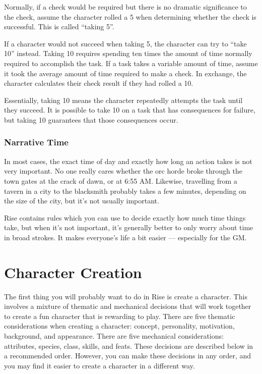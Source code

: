             \label{Taking 5}
            Normally, if a check would be required but there is no dramatic significance to the check, assume the character rolled a 5 when determining whether the check is successful.
            This is called ``taking 5''.

            \label{Taking 10}
            If a character would not succeed when taking 5, the character can try to ``take 10'' instead.
            Taking 10 requires spending ten times the amount of time normally required to accomplish the task.
            If a task takes a variable amount of time, assume it took the average amount of time required to make a check.
            In exchange, the character calculates their check result if they had rolled a 10.

            Essentially, taking 10 means the character repeatedly attempts the task until they succeed.
            It is possible to take 10 on a task that has consequences for failure, but taking 10 guarantees that those consequences occur.

        \subsubsection{Narrative Time}
            In most cases, the exact time of day and exactly how long an action takes is not very important.
            No one really cares whether the orc horde broke through the town gates at the crack of dawn, or at 6:55 AM\@.
            Likewise, travelling from a tavern in a city to the blacksmith probably takes a few minutes, depending on the size of the city, but it's not usually important.

            Rise contains rules which you can use to decide exactly how much time things take, but when it's not important, it's generally better to only worry about time in broad strokes.
            It makes everyone's life a bit easier --- especially for the GM\@.

\section{Character Creation}

    The first thing you will probably want to do in Rise is create a character.
    This involves a mixture of thematic and mechanical decisions that will work together to create a fun character that is rewarding to play.
    There are five thematic considerations when creating a character: concept, personality, motivation, background, and appearance.
    There are five mechanical considerations: attributes, species, class, skills, and feats.
    These decisions are described below in a recommended order.
    However, you can make these decisions in any order, and you may find it easier to create a character in a different way.  


